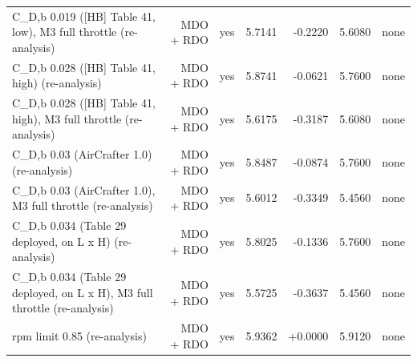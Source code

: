 \begin{table}[htbp]
{\begin{tabular}{lrrrrrr}
C\_D,b 0.019 ([HB] Table 41, low), M3 full throttle (re-analysis) & MDO + RDO & yes & 5.7141 & -0.2220 & 5.6080 & none \\
C\_D,b 0.028 ([HB] Table 41, high) (re-analysis) & MDO + RDO & yes & 5.8741 & -0.0621 & 5.7600 & none \\
C\_D,b 0.028 ([HB] Table 41, high), M3 full throttle (re-analysis) & MDO + RDO & yes & 5.6175 & -0.3187 & 5.6080 & none \\
C\_D,b 0.03 (AirCrafter 1.0) (re-analysis) & MDO + RDO & yes & 5.8487 & -0.0874 & 5.7600 & none \\
C\_D,b 0.03 (AirCrafter 1.0), M3 full throttle (re-analysis) & MDO + RDO & yes & 5.6012 & -0.3349 & 5.4560 & none \\
C\_D,b 0.034 (Table 29 deployed, on L x H) (re-analysis) & MDO + RDO & yes & 5.8025 & -0.1336 & 5.7600 & none \\
C\_D,b 0.034 (Table 29 deployed, on L x H), M3 full throttle (re-analysis) & MDO + RDO & yes & 5.5725 & -0.3637 & 5.4560 & none \\
rpm limit 0.85 (re-analysis) & MDO + RDO & yes & 5.9362 & +0.0000 & 5.9120 & none \\
\bottomrule
\end{tabular}}
\end{table}
